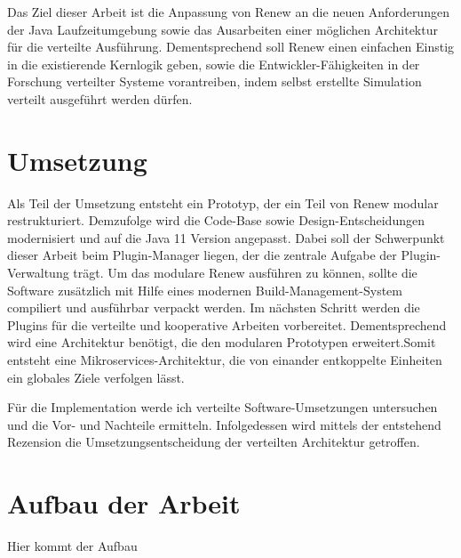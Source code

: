 Das Ziel dieser Arbeit ist die Anpassung von Renew an die neuen Anforderungen der Java Laufzeitumgebung sowie das Ausarbeiten einer möglichen Architektur für die verteilte Ausführung. Dementsprechend soll Renew einen einfachen Einstig in die existierende Kernlogik geben, sowie die Entwickler-Fähigkeiten in der Forschung verteilter Systeme vorantreiben, indem  selbst erstellte Simulation verteilt ausgeführt werden dürfen.


\section{Umsetzung} \label{sec:U}

Als Teil der Umsetzung entsteht ein Prototyp, der ein Teil von Renew modular restrukturiert. Demzufolge wird die Code-Base sowie Design-Entscheidungen modernisiert und auf die Java 11 Version angepasst. Dabei soll der Schwerpunkt dieser Arbeit beim Plugin-Manager liegen, der die zentrale Aufgabe der Plugin-Verwaltung trägt. Um das modulare Renew ausführen zu können, sollte die Software zusätzlich mit Hilfe eines modernen Build-Management-System compiliert und ausführbar verpackt werden. Im nächsten Schritt werden die Plugins für die verteilte und kooperative Arbeiten vorbereitet. Dementsprechend wird eine Architektur benötigt, die den modularen Prototypen erweitert.Somit entsteht eine Mikroservices-Architektur, die von einander entkoppelte Einheiten ein globales Ziele verfolgen lässt.


Für die Implementation werde ich verteilte Software-Umsetzungen untersuchen und die Vor- und Nachteile ermitteln.
Infolgedessen wird mittels der entstehend Rezension die Umsetzungsentscheidung der verteilten Architektur getroffen.



\section{Aufbau der Arbeit} \label{sec:AdA}
Hier kommt der Aufbau 

